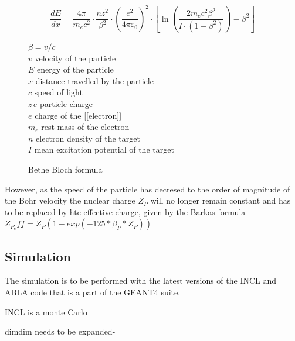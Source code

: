\begin{figure}

\begin{equation}
 \frac{dE}{dx} = \frac{4 \pi}{m_e c^2} \cdot \frac{nz^2}{\beta^2} \cdot \left(\frac{e^2}{4\pi\varepsilon_0}\right)^2 \cdot \left[\ln \left(\frac{2m_e c^2 \beta^2}{I \cdot (1-\beta^2)}\right) - \beta^2\right]
\label{bethebloch}
\end{equation}

$\beta = v/c $\\
$v$ 
velocity of the particle \\
$E$ 
energy of the particle\\
$x$ 
distance travelled by the particle\\
$c$ 
speed of light\\
$z\,e$ 
particle charge\\
$e$ 
charge of the [[electron]]\\
$m_e$ 
rest mass of the electron\\
$n$ 
electron density of the target\\
$I$ 
mean excitation potential of the target\\

\caption{Bethe Bloch formula}
\end{figure} 

However, as the speed of the particle has decresed to the order of magnitude of the Bohr velocity the nuclear charge $Z_P$ will no longer remain constant and has to be replaced by hte effective charge, given by the Barkas formula $Z_P_eff = Z_P(1-exp(-125*\beta_P*Z_P))$



\subsection{Simulation}

The simulation is to be performed with the latest versions of the INCL and ABLA code that is a part of the GEANT4 suite.

INCL is a monte Carlo 

dimdim needs to be expanded-

